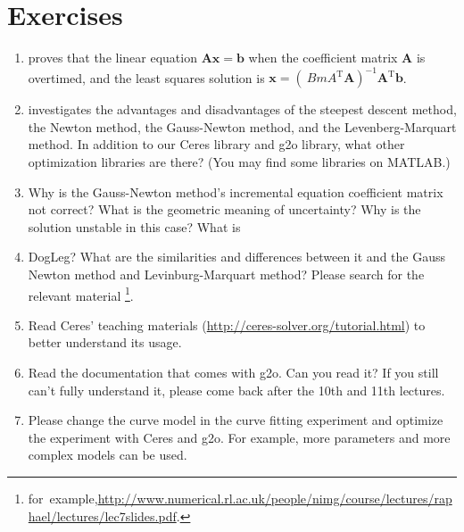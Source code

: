\section*{ Exercises}
\begin{enumerate}
\item proves that the linear equation $\bm{A} \bm{x} = \bm{b}$ when the coefficient matrix $\bm{A}$ is overtimed, and the least squares solution is $\bm{x} = (\ Bm{A}^\mathrm{T}\bm{A})^{-1}\bm{A}^\mathrm{T} \bm{b}$.
\item investigates the advantages and disadvantages of the steepest descent method, the Newton method, the Gauss-Newton method, and the Levenberg-Marquart method. In addition to our Ceres library and g2o library, what other optimization libraries are there? (You may find some libraries on MATLAB.)
\item Why is the Gauss-Newton method's incremental equation coefficient matrix not correct? What is the geometric meaning of uncertainty? Why is the solution unstable in this case?
What is \item DogLeg? What are the similarities and differences between it and the Gauss Newton method and Levinburg-Marquart method? Please search for the relevant material \footnote{\mbox{for example,}\url{http://www.numerical.rl.ac.uk/people/nimg/course/lectures/raphael/lectures/lec7slides.pdf}. }.
\item Read Ceres' teaching materials (\url{http://ceres-solver.org/tutorial.html}) to better understand its usage.
\item Read the documentation that comes with g2o. Can you read it? If you still can't fully understand it, please come back after the 10th and 11th lectures.
\item[\optional] Please change the curve model in the curve fitting experiment and optimize the experiment with Ceres and g2o. For example, more parameters and more complex models can be used.
\end{enumerate}